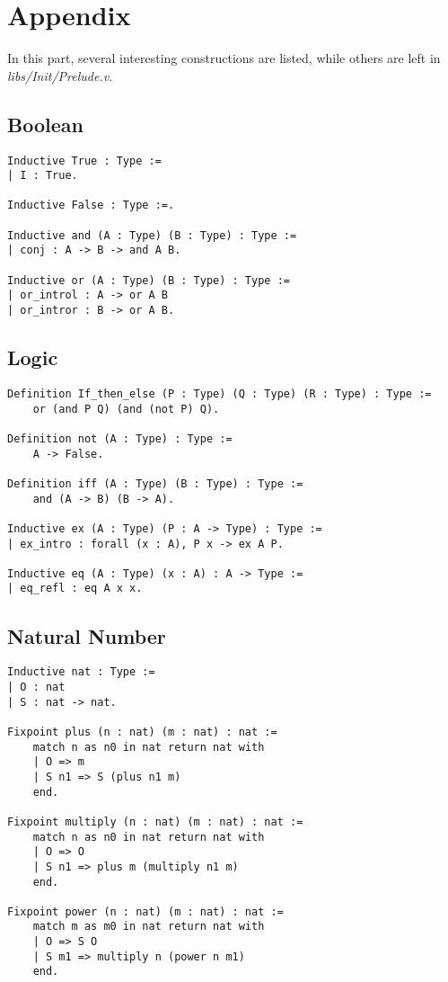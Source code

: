 \section*{Appendix}

In this part, several interesting constructions are listed, 
while others are left in \textit{libs/Init/Prelude.v}.

\subsection*{Boolean}
\begin{center}
\begin{verbatim}
Inductive True : Type :=
| I : True.

Inductive False : Type :=.

Inductive and (A : Type) (B : Type) : Type :=
| conj : A -> B -> and A B.

Inductive or (A : Type) (B : Type) : Type :=
| or_introl : A -> or A B
| or_intror : B -> or A B.
\end{verbatim}
\end{center}

\subsection*{Logic}
\begin{center}
\begin{verbatim}
Definition If_then_else (P : Type) (Q : Type) (R : Type) : Type :=
    or (and P Q) (and (not P) Q).

Definition not (A : Type) : Type :=
    A -> False.

Definition iff (A : Type) (B : Type) : Type :=
    and (A -> B) (B -> A).

Inductive ex (A : Type) (P : A -> Type) : Type :=
| ex_intro : forall (x : A), P x -> ex A P.

Inductive eq (A : Type) (x : A) : A -> Type :=
| eq_refl : eq A x x.
\end{verbatim}
\end{center}

\subsection*{Natural Number}
\begin{center}
\begin{verbatim}
Inductive nat : Type :=
| O : nat
| S : nat -> nat.

Fixpoint plus (n : nat) (m : nat) : nat :=
    match n as n0 in nat return nat with
    | O => m
    | S n1 => S (plus n1 m)
    end.

Fixpoint multiply (n : nat) (m : nat) : nat :=
    match n as n0 in nat return nat with
    | O => O
    | S n1 => plus m (multiply n1 m)
    end.

Fixpoint power (n : nat) (m : nat) : nat :=
    match m as m0 in nat return nat with
    | O => S O
    | S m1 => multiply n (power n m1)
    end.
\end{verbatim}
\end{center}

